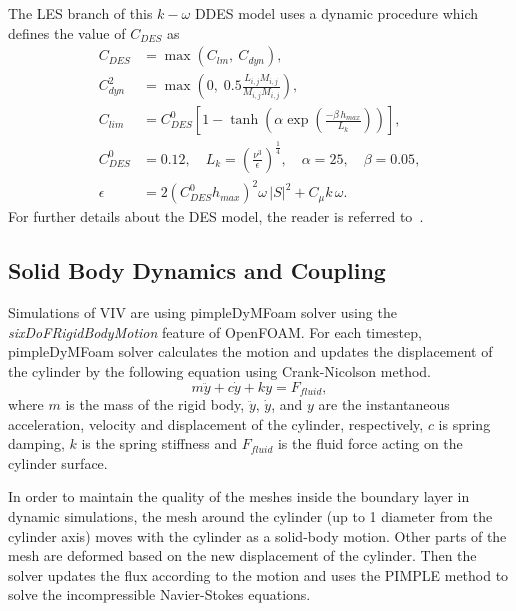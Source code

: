 The LES branch of this $k-\omega$ DDES model uses a dynamic procedure which
defines the value of $C_{DES}$ as
%
\begin{align}
  C_{DES}   & =  \max( C_{lm},~C_{dyn} ), \nonumber \\
  C_{dyn}^2 & = \max \left( 0,\; 0.5 \frac{L_{i,j} M_{i,j}}{M_{i,j} M_{i,j}}\right), \nonumber \\
  C_{lim}   &=C_{DES}^0 \left[1-\tanh \left(\alpha \exp \left(\frac{-\beta \, h_{max}}{L_k}\right)\right)\right],\\
  C_{DES}^0 &=0.12, \quad   L_k=\left(\frac{\nu^3}{\epsilon}\right)^{\frac{1}{4}},  \quad  \alpha=25,  \quad  \beta=0.05, \nonumber \\
  \epsilon  &= 2 \left(C_{DES}^0 h_{max} \right)^2 \omega\,|S|^2+C_\mu k\,\omega. \nonumber
\end{align}  
%
For further details about the DES model, the reader is referred
to~\cite{yin2015dynamic}.

\subsection{Solid Body Dynamics and Coupling}
\label{sec:coupling}
%
Simulations of VIV are using pimpleDyMFoam solver using the {\em
sixDoFRigidBodyMotion} feature of OpenFOAM. For each timestep, pimpleDyMFoam
solver calculates the motion and updates the displacement of the cylinder by
the following equation using Crank-Nicolson method.
%
\begin{equation}
  m\ddot{y} + c\dot{y} + ky = F_{fluid},
  \label{eq:solidBodyDynamics}
\end{equation}
%
where $m$ is the mass of the rigid body, $\ddot{y}$, $\dot{y}$, and $y$ are the
instantaneous acceleration, velocity and displacement of the cylinder,
respectively, $c$ is spring damping, $k$ is the spring stiffness and
$F_{fluid}$ is the fluid force acting on the cylinder surface.

In order to maintain the quality of the meshes inside the boundary layer in
dynamic simulations, the mesh around the cylinder (up to 1 diameter from the
cylinder axis) moves with the cylinder as a solid-body motion. Other parts of
the mesh are deformed based on the new displacement of the cylinder. Then the
solver updates the flux according to the motion and uses the PIMPLE method to
solve the incompressible Navier-Stokes equations.


